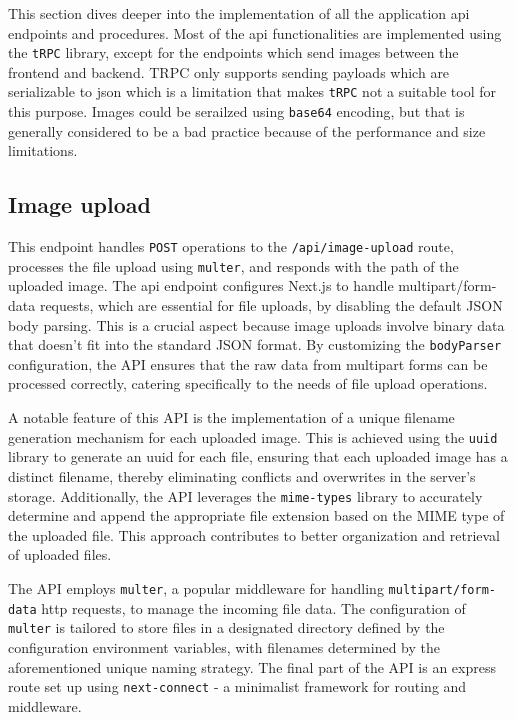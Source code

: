 This section dives deeper into the implementation of all the application \acrshort{api} endpoints and procedures. Most of the \acrshort{api} functionalities are implemented using the \texttt{tRPC} library, except for the endpoints which send images between the frontend and backend. TRPC only supports sending payloads which are serializable to \acrfull{json}\cite{trpc-files} which is a limitation that makes \texttt{tRPC} not a suitable tool for this purpose. Images could be serailzed using \texttt{base64} encoding, but that is generally considered to be a bad practice because of the performance and size limitations\cite{base64}.

\subsection{Image upload}
\label{sec:api-image-upload}


This endpoint handles \texttt{POST} operations to the \texttt{/api/image-upload} route, processes the file upload using \texttt{multer}, and responds with the path of the uploaded image. The \acrshort{api} endpoint configures Next.js to handle multipart/form-data requests, which are essential for file uploads, by disabling the default JSON body parsing. This is a crucial aspect because image uploads involve binary data that doesn't fit into the standard JSON format. By customizing the \texttt{bodyParser} configuration, the API ensures that the raw data from multipart forms can be processed correctly, catering specifically to the needs of file upload operations.

A notable feature of this API is the implementation of a unique filename generation mechanism for each uploaded image. This is achieved using the \texttt{uuid} library to generate an \acrfull{uuid} for each file, ensuring that each uploaded image has a distinct filename, thereby eliminating conflicts and overwrites in the server's storage. Additionally, the API leverages the \texttt{mime-types} library to accurately determine and append the appropriate file extension based on the MIME type of the uploaded file. This approach contributes to better organization and retrieval of uploaded files.

The API employs \texttt{multer}, a popular middleware for handling \texttt{multipart/form-data} \acrshort{http} requests, to manage the incoming file data. The configuration of \texttt{multer} is tailored to store files in a designated directory defined by the configuration environment variables, with filenames determined by the aforementioned unique naming strategy. The final part of the API is an express route set up using \texttt{next-connect} - a minimalist framework for routing and middleware.

